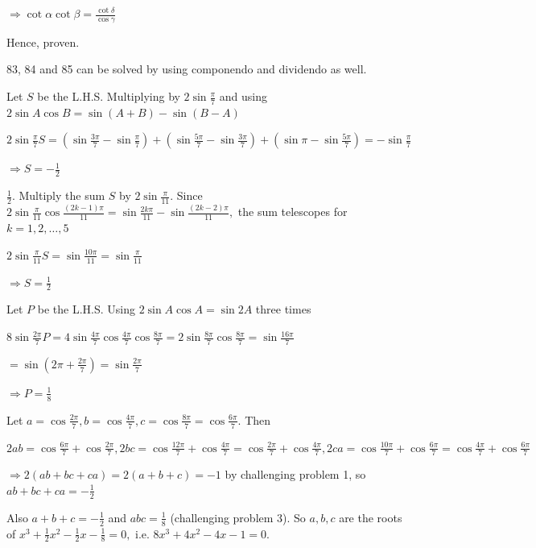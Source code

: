   $\Rightarrow \cot\alpha\cot\beta = \frac{\cot\delta}{\cos\gamma}$

  Hence, proven.

  83, 84 and 85 can be solved by using componendo and dividendo as well.
\stopitemize

\subject{Challenging Problems}
\startitemize[n, 1*broad]
\item Let $S$ be the L.H.S. Multiplying by $2\sin\frac{\pi}{7}$ and using $2\sin A\cos B = \sin(A + B) - \sin(B - A)$

  $2\sin\frac{\pi}{7}S = \left(\sin\frac{3\pi}{7} - \sin\frac{\pi}{7}\right) + \left(\sin\frac{5\pi}{7} -
  \sin\frac{3\pi}{7}\right) + \left(\sin\pi - \sin\frac{5\pi}{7}\right) = -\sin\frac{\pi}{7}$

  $\Rightarrow S = -\frac{1}{2}$

\item $\frac{1}{2}$. Multiply the sum $S$ by $2\sin\frac{\pi}{11}$. Since $2\sin\frac{\pi}{11}\cos\frac{(2k - 1)\pi}{11} =
  \sin\frac{2k\pi}{11} - \sin\frac{(2k - 2)\pi}{11},$ the sum telescopes for $k = 1, 2, \ldots, 5$

  $2\sin\frac{\pi}{11}S = \sin\frac{10\pi}{11} = \sin\frac{\pi}{11}$

  $\Rightarrow S = \frac{1}{2}$

\item Let $P$ be the L.H.S. Using $2\sin A\cos A = \sin 2A$ three times

  $8\sin\frac{2\pi}{7}P = 4\sin\frac{4\pi}{7}\cos\frac{4\pi}{7}\cos\frac{8\pi}{7} = 2\sin\frac{8\pi}{7}\cos\frac{8\pi}{7} =
  \sin\frac{16\pi}{7}$

  $= \sin\left(2\pi + \frac{2\pi}{7}\right) = \sin\frac{2\pi}{7}$

  $\Rightarrow P = \frac{1}{8}$

\item Let $a = \cos\frac{2\pi}{7}, b = \cos\frac{4\pi}{7}, c = \cos\frac{8\pi}{7} = \cos\frac{6\pi}{7}$. Then

  $2ab = \cos\frac{6\pi}{7} + \cos\frac{2\pi}{7}, 2bc = \cos\frac{12\pi}{7} + \cos\frac{4\pi}{7} = \cos\frac{2\pi}{7} +
  \cos\frac{4\pi}{7}, 2ca = \cos\frac{10\pi}{7} + \cos\frac{6\pi}{7} = \cos\frac{4\pi}{7} + \cos\frac{6\pi}{7}$

  $\Rightarrow 2(ab + bc + ca) = 2(a + b + c) = -1$ by challenging problem 1, so $ab + bc + ca = -\frac{1}{2}$

  Also $a + b + c = -\frac{1}{2}$ and $abc = \frac{1}{8}$ (challenging problem 3). So $a, b, c$ are the roots of $x^3 + \frac{1}{2}x^2 -
  \frac{1}{2}x - \frac{1}{8} = 0,$ i.e. $8x^3 + 4x^2 - 4x - 1 = 0$.

